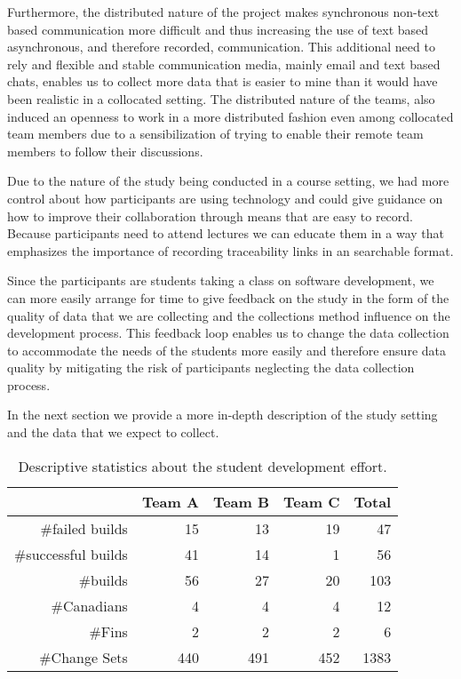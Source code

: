Furthermore, the distributed nature of the project makes synchronous non-text based communication more difficult and thus increasing the use of text based asynchronous, and therefore recorded, communication.
This additional need to rely and flexible and stable communication media, mainly email and text based chats, enables us to collect more data that is easier to mine than it would have been realistic in a collocated setting.
The distributed nature of the teams, also induced an openness to work in a more distributed fashion even among collocated team members due to a sensibilization of trying to enable their remote team members to follow their discussions.

Due to the nature of the study being conducted in a course setting, we had more control about how participants are using technology and could give guidance on how to improve their collaboration through means that are easy to record.
Because participants need to attend lectures we can educate them in a way that emphasizes the importance of recording traceability links in an searchable format.

Since the participants are students taking a class on software development, we can more easily arrange for time to give feedback on the study in the form of the quality of data that we are collecting and the collections method influence on the development process.
This feedback loop enables us to change the data collection to accommodate the needs of the students more easily and therefore ensure data quality by mitigating the risk of participants neglecting the data collection process. 

In the next section we provide a more in-depth description of the study setting and the data that we expect to collect.

\begin{table}[t]
\centering
\begin{tabular}{rrrrr}
\toprule
& Team A & Team B & Team C & Total\\
\midrule
\#failed builds &15&13&19&47\\
\#successful builds &41&14&1&56\\ 
\#builds & 56 & 27 & 20 & 103 \\
\#Canadians & 4 & 4 & 4 & 12\\
\#Fins & 2 & 2 & 2 & 6\\
\#Change Sets & 440 & 491 &  452& 1383\\
\bottomrule
\end{tabular}
\caption{Descriptive statistics about the student development effort.}
\label{tab:gsd:desc:stats}
\end{table}

